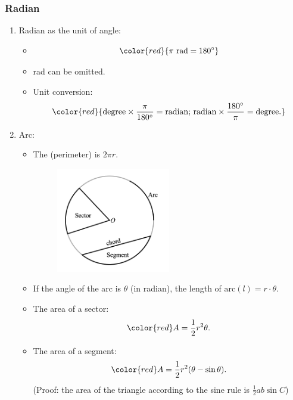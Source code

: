 \documentclass[12pt, a4paper]{article}
\begin{document}
\subsubsection{Radian}
\begin{enumerate}
  \item Radian as the unit of angle: 
  \begin{itemize}
    \item $${\color{red}{\pi\ \text{rad}=180^\circ}}$$
    \item rad can be omitted. {}
    \item Unit conversion: $${\color{red}{\text{degree}\times\frac{\pi}{180^\circ}=\text{radian;\ radian}\times\frac{180^\circ}{\pi}=\text{degree}.}}$$
  \end{itemize}
  \item Arc: 
  \begin{itemize}
    \item The \textbf{\color{red}{circumference}} (perimeter) is $2\pi r$.
    \begin{figure}[H]
      \centering
      \includegraphics[width=0.5\textwidth]{Fig.3.18.jpg}
    \end{figure}
    \item If the angle of the arc is $\theta$ (in radian), the length of $\text{arc}(l)=r\cdot\theta$.
    \item The area of a sector: $$\color{red}A=\frac{1}{2}r^2\theta.$$
    \item The area of a segment: $$\color{red}A=\frac{1}{2}r^2(\theta-\sin\theta).$$(Proof: the area of the triangle according to the sine rule is $\frac{1}{2}ab\sin C$)
  \end{itemize}
\end{enumerate}
\end{document}

